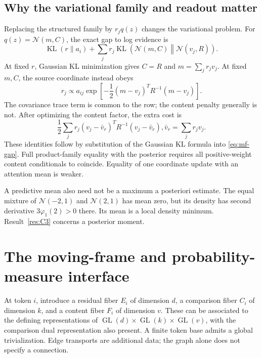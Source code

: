 \documentclass[11pt]{article}
\newcommand{\KL}{\operatorname{KL}}
\newcommand{\GL}{\operatorname{GL}}
\begin{document}
\subsection{Why the variational family and readout matter}
\label{sec:meanfield}
Replacing the structured family by $r_jq(z)$ changes the variational problem. For $q(z)=\mathcal N(m,C)$, the exact gap to log evidence is
\begin{equation}
\KL(r\|a_i)+\sum_jr_j\KL\left(\mathcal N(m,C)\middle\|\mathcal N(v_j,R)\right).
\label{eq:mf-gap}
\end{equation}
At fixed $r$, Gaussian KL minimization gives $C=R$ and $m=\sum_jr_jv_j$. At fixed $m,C$, the source coordinate instead obeys
\begin{equation}
r_j\propto a_{ij}\exp\left[-\frac12(m-v_j)^TR^{-1}(m-v_j)\right].
\label{eq:mf-routing}
\end{equation}
The covariance trace term is common to the row; the content penalty generally is not. After optimizing the content factor, the extra cost is
\begin{equation}
\frac12\sum_jr_j(v_j-\bar v_r)^TR^{-1}(v_j-\bar v_r),
\bar v_r=\sum_jr_jv_j.
\end{equation}
These identities follow by substitution of the Gaussian KL formula into \eqref{eq:mf-gap}. Full product-family equality with the posterior requires all positive-weight content conditionals to coincide. Equality of one coordinate update with an attention mean is weaker.

A predictive mean also need not be a maximum a posteriori estimate. The equal mixture of $\mathcal N(-2,1)$ and $\mathcal N(2,1)$ has mean zero, but its density has second derivative $3\varphi_1(2)>0$ there. Its mean is a local density minimum. Result~\ref{res:C3} concerns a posterior moment.

\section{The moving-frame and probability-measure interface}
\label{sec:gauge}
At token $i$, introduce a residual fiber $E_i$ of dimension $d$, a comparison fiber $C_i$ of dimension $k$, and a content fiber $F_i$ of dimension $v$. These can be associated to the defining representations of $\GL(d)\times\GL(k)\times\GL(v)$, with the comparison dual representation also present. A finite token base admits a global trivialization. Edge transports are additional data; the graph alone does not specify a connection.
\end{document}
